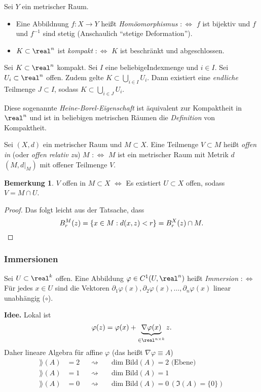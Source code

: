 \documentclass[
 a4paper,
 12pt,
 parskip=half
 ]{scrartcl}
\theoremstyle{plain}
\theoremstyle{definition}
\newtheorem*{rmrk}{Bemerkung}
\numberwithin{equation}{section}
\begin{document}
Sei $Y$ ein metrischer Raum.
\begin{itemize}
 \item Eine Abbildnung $f\colon X \to Y$ heißt \emph{Homöomorphismus} $:\Leftrightarrow$ $f$ ist bijektiv und $f$ und $f^{-1}$ sind stetig (Anschaulich ``stetige Deformation'').
 \item $K \subset \real^n$ ist \emph{kompakt} $:\Leftrightarrow$ $K$ ist beschränkt und abgeschlossen.
\end{itemize}

\begin{thm}
 Sei $K \subset \real^n$ kompakt. Sei $I$ eine beliebige\footnotemark Indexmenge und $i \in I$. Sei $U_i \subset \real^n$ offen. Zudem gelte $K \subset \bigcup_{i \in I} U_i$. Dann existiert eine \emph{endliche} Teilmenge $J \subset I$, sodass $K \subset \bigcup_{i \in J} U_i$.
\end{thm}

Diese sogenannte \emph{Heine-Borel-Eigenschaft} ist äquivalent zur Kompaktheit in $\real^n$ und ist in beliebigen metrischen Räumen die \emph{Definition} von Kompaktheit.

Sei $(X,d)$ ein metrischer Raum und $M \subset X$. Eine Teilmenge $V \subset M$ heißt \emph{offen in} (oder \emph{offen relativ zu}) $M$ $:\Leftrightarrow$ $M$ ist ein metrischer Raum mit Metrik $d$ $(M,d|_M)$ mit offener Teilmenge $V$.

\begin{rmrk}
$V$ offen in $M \subset X$ $\Leftrightarrow$ Es existiert $U \subset X$ offen, sodass $V = M \cap U$.
\end{rmrk}

\begin{proof}
 Das folgt leicht aus der Tatsache, dass 
 \[ B_r^M(z) = \{ x \in M: d(x,z) < r \} = B_r^X(z) \cap M. \qedhere \]
\end{proof}

\subsubsection{Immersionen}
Sei $U \subset \real^k$ offen. Eine Abbildung $\varphi \in C^1(U, \real^n)$ heißt \emph{Immersion} $:\Leftrightarrow$ Für jedes $x \in U$ sind die Vektoren $\partial_1 \varphi(x), \partial_2 \varphi(x), \ldots, \partial_n \varphi(x)$ linear unabhängig ($\circ$).

\textbf{Idee.} Lokal ist 
\[ \varphi(z) = \varphi(x) + \underbrace{\nabla \varphi(x)}_{\in \real^{n \times k}} z. \]
Daher lineare Algebra für affine $\varphi$ (das heißt $\nabla\varphi \equiv A$)
\[ \begin{aligned}
   \rang(A) &= 2 & &\rightsquigarrow & &\dim \text{Bild}(A) = 2 \text{ (Ebene)} \\
   \rang(A) &= 1 & &\rightsquigarrow & &\dim \text{Bild}(A) = 1  \\
   \rang(A) &= 0 & &\rightsquigarrow & &\dim \text{Bild}(A) = 0 \, (\Im(A)=\{0\})
   \end{aligned} \]
   
\end{document}

